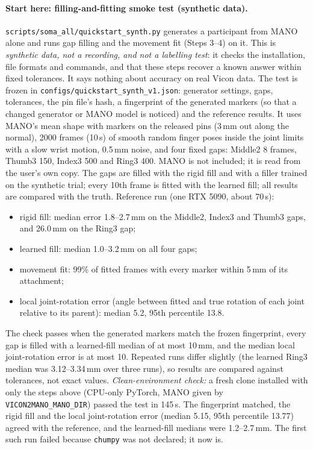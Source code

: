 \documentclass[11pt,a4paper]{article}
\begin{document}
\paragraph{Start here: filling-and-fitting smoke test (synthetic data).}
\texttt{scripts/soma\_all/quickstart\_synth.py} generates a participant from MANO alone and runs gap filling and the movement
fit (Steps 3--4) on it. This is \emph{synthetic data, not a recording, and not a labelling test}: it checks the
installation, file formats and commands, and that these steps recover a known answer within fixed tolerances. It says
nothing about accuracy on real Vicon data. The test is frozen in \texttt{configs/quickstart\_synth\_v1.json}: generator
settings, gaps, tolerances, the pin file's hash, a fingerprint of the generated markers (so that a changed generator or
MANO model is noticed) and the reference results. It uses MANO's mean shape with markers on the released pins (3\,mm out
along the normal), 2000 frames (10\,s) of smooth random finger poses inside the joint limits with a slow wrist motion,
0.5\,mm noise, and four fixed gaps: Middle2 8 frames, Thumb3 150, Index3 500 and Ring3 400. MANO is not included; it is
read from the user's own copy. The gaps are filled with the rigid fill and with a filler trained on the synthetic trial;
every 10th frame is fitted with the learned fill; all results are compared with the truth. Reference run (one RTX
5090, about 70\,s):
\begin{itemize}[nosep]
  \item rigid fill: median error 1.8--2.7\,mm on the Middle2, Index3 and Thumb3 gaps, and 26.0\,mm on the Ring3 gap;
  \item learned fill: median 1.0--3.2\,mm on all four gaps;
  \item movement fit: 99\% of fitted frames with every marker within 5\,mm of its attachment;
  \item local joint-rotation error (angle between fitted and true rotation of each joint relative to its parent): median
  5.2\textdegree, 95th percentile 13.8\textdegree.
\end{itemize}
The check passes when the generated markers match the frozen fingerprint, every gap is filled with a learned-fill
median of at most 10\,mm, and the median local joint-rotation error is at most 10\textdegree. Repeated runs differ
slightly (the learned Ring3 median was 3.12--3.34\,mm over three runs), so results are compared against tolerances, not
exact values. \emph{Clean-environment check:} a fresh clone installed with only the steps above (CPU-only PyTorch, MANO
given by \texttt{VICON2MANO\_MANO\_DIR}) passed the test in 145\,s. The fingerprint matched, the rigid fill and the
local joint-rotation error (median 5.15\textdegree, 95th percentile 13.77\textdegree) agreed with the reference, and the
learned-fill medians were 1.2--2.7\,mm. The first such run failed because \texttt{chumpy} was not declared; it now is.
\end{document}

